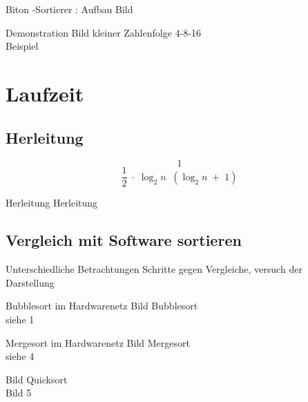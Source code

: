 \documentclass[ucs,9pt]{beamer}
\begin{document}
\begin{frame}{Biton -Sortierer : Aufbau}
    Bild
\end{frame}

\begin{frame}{Demonstration}
    Bild kleiner Zahlenfolge 4-8-16\\
    Beispiel
\end{frame}

\section{Laufzeit}
\subsection{Herleitung}
\begin{frame}
 {$$ 1 $$}
 {$$ \frac{1}{2}\; \cdot\;\log_2 n \;\; (\log_2 n\;+\;1)$$}
\end{frame}
\begin{frame}{Herleitung}
    Herleitung
\end{frame}
\subsection{Vergleich mit Software sortieren}
\begin{frame}
    Unterschiedliche Betrachtungen Schritte gegen Vergleiche, versuch der Darstellung
\end{frame}

\begin{frame}{Bubblesort im Hardwarenetz}
    Bild Bubblesort \\
    siehe 1     
\end{frame}

\begin{frame}{Mergesort im Hardwarenetz}
    Bild Mergesort \\
    siehe 4 
\end{frame}

\begin{frame}
    Bild Quicksort \\
    Bild 5
\end{frame}
\end{document}
